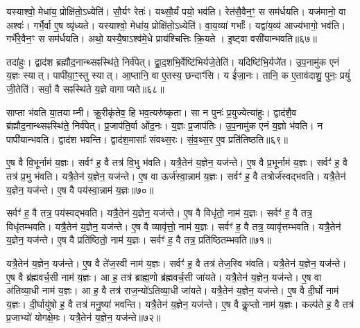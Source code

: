 यस्याश्वो॒ मेधा॑य॒ प्रोक्षि॑तो॒\-ऽध्येति॑।
सौ॒र्यꣳ रेतः॑।
यथ्सौ॒र्यं पयो॒ भव॑ति।
रेत॑सै॒वैन॒ꣳ॒ स सम॑र्धयति।
यज॑मानो॒ वा अश्वः॑।
गर्भै॒र्वा ए॒ष व्यृ॑ध्यते।
यस्याश्वो॒ मेधा॑य॒ प्रोक्षि॑तो॒\-ऽध्येति॑।
वा॒य॒व्या॑ गर्भाः᳚।
यद्वा॑य॒व्य॑ आज्य॑भागो॒ भव॑ति।
गर्भै॑रे॒वैन॒ꣳ स सम॑र्धयति।
अथो॒ यस्यै॒षा\-ऽश्व॑मे॒धे प्राय॑श्चित्तिः क्रि॒यते।
इ॒ष्ट्वा वसी॑यान्भवति॥६७॥\anuvakamend[वि॒न्दत्यश्लो॑णो है॒व भ॑वत्यधी॒यादृ॑ध्यते॒ गर्भै॑रे॒वैन॒ꣳ॒ स सम॑र्धयति॒ द्वे च॑]

तदा॑हुः।
द्वाद॑श ब्रह्मौद॒नान्थ्सꣴस्थि॑ते॒ निर्व॑पेत्।
द्वा॒द॒शभि॒र्वेष्टि॑भिर्यजे॒तेति॑।
यदिष्टि॑भि॒र्यजे॑त।
उ॒प॒नामु॑क एनं य॒ज्ञः स्यात्।
पापी॑या॒ꣳ॒स्तु स्यात्।
आ॒प्तानि॒ वा ए॒तस्य॒ छन्दाꣳ॑सि।
य ई॑जा॒नः।
तानि॒ क ए॒ताव॑दाशु॒ पुनः॒ प्रयुं॑ जी॒तेति॑।
सर्वा॒ वै सꣴस्थि॑ते य॒ज्ञे वागाप्यते॥६८॥

साप्ता भ॑वति या॒तयाम्नी।
क्रू॒रीकृ॑तेव॒ हि भव॒त्यरु॑ष्कृता।
सा न पुनः॑ प्र॒युज्येत्या॑हुः।
द्वाद॑शै॒व ब्र॑ह्मौद॒नान्थ्सꣴस्थि॑ते॒ निर्व॑पेत्।
प्र॒जाप॑ति॒र्वा ओ॑द॒नः।
य॒ज्ञः प्र॒जाप॑तिः।
उ॒प॒नामु॑क एनं य॒ज्ञो भ॑वति।
न पापी॑यान्भवति।
द्वाद॑श भवन्ति।
द्वाद॑श॒मासाः᳚ संवथ्स॒रः।
सं॒व॒थ्स॒र ए॒व प्रति॑तिष्ठति॥६९॥\anuvakamend[आ॒प्य॒ते॒ सं॒व॒थ्स॒र एकं॑ च]

ए॒ष वै वि॒भूर्नाम॑ य॒ज्ञः।
सर्वꣳ॑ ह॒ वै तत्र॑ वि॒भु भ॑वति।
यत्रै॒तेन॑ य॒ज्ञेन॒ यज॑न्ते।
ए॒ष वै प्र॒भूर्नाम॑ य॒ज्ञः।
सर्वꣳ॑ ह॒ वै तत्र॑ प्र॒भु भ॑वति।
यत्रै॒तेन॑ य॒ज्ञेन॒ यज॑न्ते।
ए॒ष वा ऊर्ज॑स्वा॒न्नाम॑ य॒ज्ञः।
सर्वꣳ॑ ह॒ वै तत्रोर्ज॑स्वद्भवति।
यत्रै॒तेन॑ य॒ज्ञेन॒ यज॑न्ते।
ए॒ष वै पय॑स्वा॒न्नाम॑ य॒ज्ञः॥७०॥

सर्वꣳ॑ ह॒ वै तत्र॒ पय॑स्वद्भवति।
यत्रै॒तेन॑ य॒ज्ञेन॒ यज॑न्ते।
ए॒ष वै विधृ॑तो॒ नाम॑ य॒ज्ञः।
सर्वꣳ॑ ह॒ वै तत्र॒ विधृ॑तम्भवति।
यत्रै॒तेन॑ य॒ज्ञेन॒ यज॑न्ते।
ए॒ष वै व्यावृ॑त्तो॒ नाम॑ य॒ज्ञः।
सर्वꣳ॑ ह॒ वै तत्र॒ व्यावृ॑त्तम्भवति।
यत्रै॒तेन॑ य॒ज्ञेन॒ यज॑न्ते।
ए॒ष वै प्रति॑ष्ठितो॒ नाम॑ य॒ज्ञः।
सर्वꣳ॑ ह॒ वै तत्र॒ प्रति॑ष्ठितम्भवति॥७१॥

यत्रै॒तेन॑ य॒ज्ञेन॒ यज॑न्ते।
ए॒ष वै ते॑ज॒स्वी नाम॑ य॒ज्ञः।
सर्वꣳ॑ ह॒ वै तत्र॑ तेज॒स्वि भ॑वति।
यत्रै॒तेन॑ य॒ज्ञेन॒ यज॑न्ते।
ए॒ष वै ब्र॑ह्मवर्च॒सी नाम॑ य॒ज्ञः।
आ ह॒ तत्र॑ ब्राह्म॒णो ब्र॑ह्मवर्च॒सी जा॑यते।
यत्रै॒तेन॑ य॒ज्ञेन॒ यज॑न्ते।
ए॒ष वा अ॑तिव्या॒धी नाम॑ य॒ज्ञः।
आ ह॒ वै तत्र॑ राज॒न्यो॑\-ऽतिव्या॒धी जा॑यते।
यत्रै॒तेन॑ य॒ज्ञेन॒ यज॑न्ते।
ए॒ष वै दी॒र्घो नाम॑ य॒ज्ञः।
दी॒र्घायु॑षो ह॒ वै तत्र॑ मनु॒ष्या॑ भवन्ति।
यत्रै॒तेन॑ य॒ज्ञेन॒ यज॑न्ते।
ए॒ष वै कॢ॒प्तो नाम॑ य॒ज्ञः।
कल्प॑ते ह॒ वै तत्र॑ प्र॒जाभ्यो॑ योगक्षे॒मः।
यत्रै॒तेन॑ य॒ज्ञेन॒ यज॑न्ते॥७२॥

